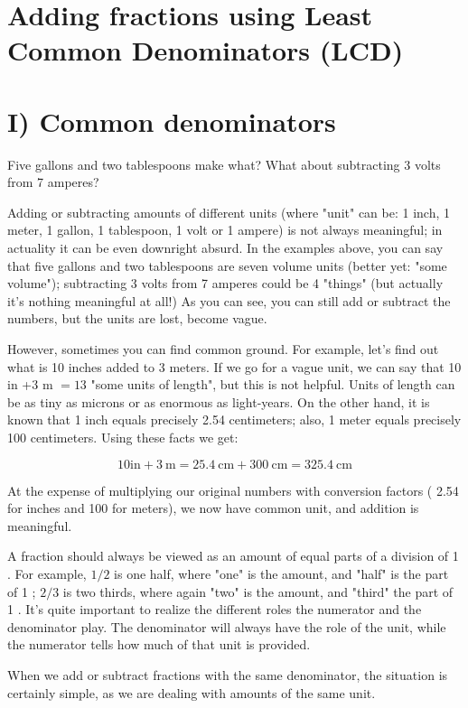 \documentclass{ximera}
\begin{document}
\section*{Adding fractions using Least Common Denominators (LCD)}
\section*{I) Common denominators}
Five gallons and two tablespoons make what? What about subtracting 3 volts from 7 amperes?

Adding or subtracting amounts of different units (where "unit" can be: 1 inch, 1 meter, 1 gallon, 1 tablespoon, 1 volt or 1 ampere) is not always meaningful; in actuality it can be even downright absurd. In the examples above, you can say that five gallons and two tablespoons are seven volume units (better yet: "some volume"); subtracting 3 volts from 7 amperes could be 4 "things" (but actually it's nothing meaningful at all!) As you can see, you can still add or subtract the numbers, but the units are lost, become vague.

However, sometimes you can find common ground. For example, let's find out what is 10 inches added to 3 meters. If we go for a vague unit, we can say that 10 in +3 m $=13$ "some units of length", but this is not helpful. Units of length can be as tiny as microns or as enormous as light-years. On the other hand, it is known that 1 inch equals precisely 2.54 centimeters; also, 1 meter equals precisely 100 centimeters. Using these facts we get:

$$10 \mathrm{in}+3 \mathrm{~m}=25.4 \mathrm{~cm}+300 \mathrm{~cm}=325.4 \mathrm{~cm}$$

At the expense of multiplying our original numbers with conversion factors ( 2.54 for inches and 100 for meters), we now have common unit, and addition is meaningful.

A fraction should always be viewed as an amount of equal parts of a division of 1 . For example, $1 / 2$ is one half, where "one" is the amount, and "half" is the part of 1 ; $2 / 3$ is two thirds, where again "two" is the amount, and "third" the part of 1 . It's quite important to realize the different roles the numerator and the denominator play. The denominator will always have the role of the unit, while the numerator tells how much of that unit is provided.

When we add or subtract fractions with the same denominator, the situation is certainly simple, as we are dealing with amounts of the same unit.
\end{document}
